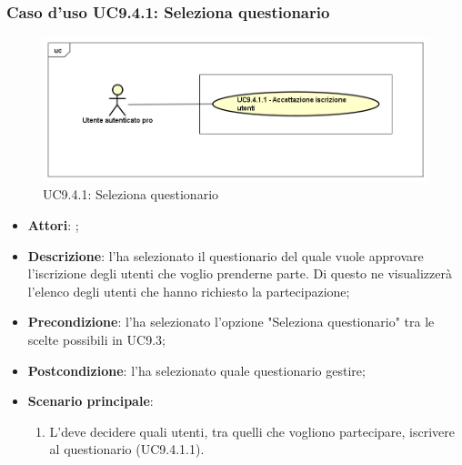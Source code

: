 		 \subsubsection{Caso d'uso UC9.4.1: Seleziona questionario}
		 \label{UC9.4.1}
		 \begin{figure}[h]
		 	\centering
		 	\includegraphics[scale=0.5,keepaspectratio]{UML/UC9_4_1.png}
		 	\caption{UC9.4.1: Seleziona questionario}
		 \end{figure}
		 \FloatBarrier
		 \begin{itemize}
		 	\item \textbf{Attori}: \uaupro;
		 	\item \textbf{Descrizione}: l'\uaupro ha selezionato il questionario del quale vuole approvare l'iscrizione degli utenti che voglio prenderne parte. Di questo ne visualizzerà l'elenco degli utenti che hanno richiesto la partecipazione; 
		 	\item \textbf{Precondizione}: l'\uaupro ha selezionato l'opzione "Seleziona questionario" tra le scelte possibili in UC9.3;
		 	\item \textbf{Postcondizione}: l'\uaupro ha selezionato quale questionario gestire;
		 	\item \textbf{Scenario principale}:
		 	\begin{enumerate}
		 		\item L'\uaupro deve decidere quali utenti, tra quelli che vogliono partecipare, iscrivere al questionario (UC9.4.1.1).
		 	\end{enumerate}
		 \end{itemize}
		 
